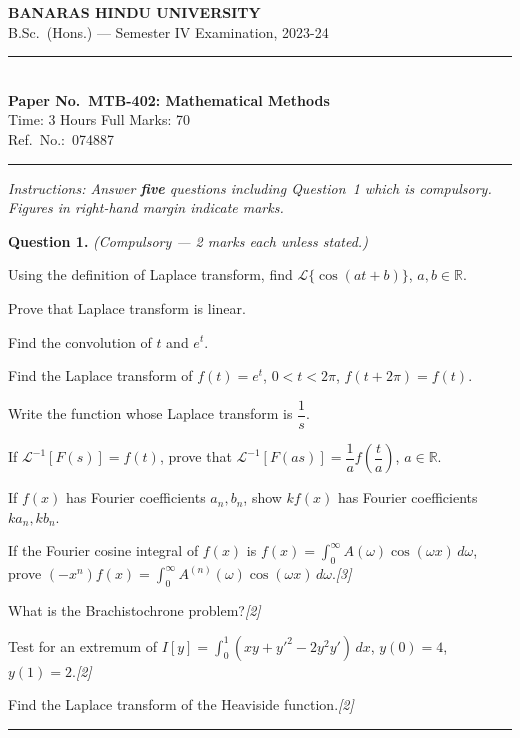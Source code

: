 \documentclass[11pt,a4paper]{article}
\newcommand{\pts}[1]{\hfill   \textit{[#1]}}
\begin{document}
\begin{center}
  {\large\bfseries BANARAS HINDU UNIVERSITY}\\[2pt]
  {\normalsize B.Sc.\ (Hons.) --- Semester IV Examination, 2023-24}\\[6pt]
  \rule{0.8\linewidth}{0.5pt}\\[6pt]
  {\large\bfseries Paper No.\ MTB-402: Mathematical Methods}\\[4pt]
  {\normalsize Time: 3 Hours \hfill Full Marks: 70}\\[2pt]
  {\small Ref.\ No.:\ 074887}
\end{center}
\rule{\linewidth}{0.4pt}
\smallskip



\noindent   \textit{Instructions: Answer   \textbf{five} questions including Question~1 which is compulsory. Figures in right-hand margin indicate marks.}
\bigskip




\noindent   \textbf{Question 1.}   \textit{(Compulsory --- 2 marks each unless stated.)}

\begin{parts}
  \item Using the definition of Laplace transform, find $\mathcal{L}\{\cos(at+b)\}$, $a,b\in\mathbb{R}$.
  \item Prove that Laplace transform is linear.
  \item Find the convolution of $t$ and $e^t$.
  \item Find the Laplace transform of $f(t)=e^t$, $0<t<2\pi$, $f(t+2\pi)=f(t)$.
  \item Write the function whose Laplace transform is $\dfrac{1}{s}$.
  \item If $\mathcal{L}^{-1}[F(s)]=f(t)$, prove that $\mathcal{L}^{-1}[F(as)]=\dfrac{1}{a}f\!\left(\dfrac{t}{a}\right)$, $a\in\mathbb{R}$.
  \item If $f(x)$ has Fourier coefficients $a_n,b_n$, show $kf(x)$ has Fourier coefficients $ka_n,kb_n$.
  \item If the Fourier cosine integral of $f(x)$ is $f(x)=\int_0^{\infty}A(\omega)\cos(\omega x)\,d\omega$, prove $(-x^n)f(x)=\int_0^{\infty}A^{(n)}(\omega)\cos(\omega x)\,d\omega$.\pts{3}
  \item What is the Brachistochrone problem?\pts{2}
  \item Test for an extremum of $I[y]=\int_0^1(xy+y'^2-2y^2y')\,dx$, $y(0)=4$, $y(1)=2$.\pts{2}
  \item Find the Laplace transform of the Heaviside function.\pts{2}
\end{parts}
\medskip\rule{\linewidth}{0.2pt}
\end{document}
